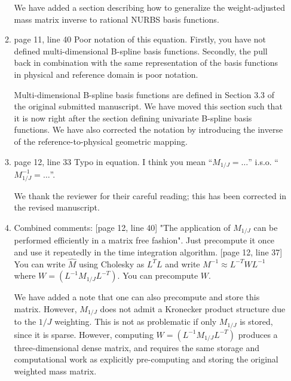 \documentclass[10pt]{article}
\newcommand{\note}[1]{{\color{violet}#1}}
\begin{document}
\begin{enumerate}
\begin{enumerate}
\note{We have added a section describing how to generalize the weight-adjusted mass matrix inverse to rational NURBS basis functions.  }

\item page 11, line 40                Poor notation of this equation. Firstly, you have not defined multi-dimensional B-spline basis functions. Secondly, the pull back in combination with the same representation of the basis functions in physical and reference domain is poor notation.

\note{Multi-dimensional B-spline basis functions are defined in Section 3.3 of the original submitted manuscript.  We have moved this section such that it is now right after the section defining univariate B-spline basis functions.  We have also corrected the notation by introducing the inverse of the reference-to-physical geometric mapping.  }

\item page 12, line 33                Typo in equation. I think you mean ``$M_{1/J} = \ldots$'' i.s.o. ``$M^{-1}_{1/J} = \ldots$''.

\note{We thank the reviewer for their careful reading; this has been corrected in the revised manuscript.}

\item Combined comments: [page 12, line 40]                "The application of $M_{1/J}$ can be performed efficiently in a matrix free fashion". Just precompute it once and  use it repeatedly in the time integration algorithm.  [page 12, line 37]           You can write $\hat{M}$ using Cholesky as $L^T L$ and write $M^{-1} \approx L^{-T} W L^{-1}$ where $W = (L^{-1}  M_{1/J} L^{-T})$.   You can precompute $W$.

\note{We have added a note that one can also precompute and store this matrix.  However, $M_{1/J}$ does not admit a Kronecker product structure due to the $1/J$ weighting.  
This is not as problematic if only $M_{1/J}$ is stored, since it is sparse.  However, computing $W = (L^{-1}  M_{1/J} L^{-T})$ produces a three-dimensional dense matrix, and requires the same storage and computational work as explicitly pre-computing and storing the original weighted mass matrix. }


\end{enumerate}
\end{enumerate}
\end{document}
